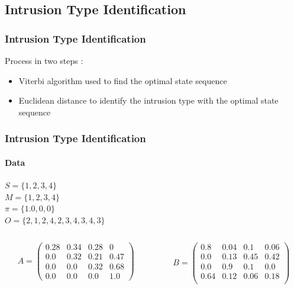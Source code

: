 \documentclass{beamer}
\begin{document}
\subsection{Intrusion Type Identification}
\begin{frame}
  \frametitle{Intrusion Type Identification}
  Process in two steps :
  \begin{itemize}
  \item Viterbi algorithm used to find the optimal state sequence
  \item Euclidean distance to identify the intrusion type with the
    optimal state sequence
  \end{itemize}
\end{frame}
\begin{frame}
  \frametitle{Intrusion Type Identification}
  \framesubtitle{Data}
  $S = \{1,2,3,4\}$\\
  $M = \{1,2,3,4\}$\\
  $\pi = \{1.0,0,0\}$\\
  $O = \{2,1,2,4,2,3,4,3,4,3\}$
  \begin{columns}[T]
    \begin{column}{.45\textwidth}
      $$
      A = \begin{pmatrix}
        0.28 & 0.34 & 0.28 & 0\\
        0.0 & 0.32 & 0.21 & 0.47\\
        0.0 & 0.0 & 0.32 & 0.68\\
        0.0 & 0.0 & 0.0 & 1.0
      \end{pmatrix}
      $$
    \end{column}
    \begin{column}{.45\textwidth}
      $$
      B = \begin{pmatrix}
        0.8 & 0.04 & 0.1 & 0.06\\
        0.0 & 0.13 & 0.45 & 0.42\\
        0.0 & 0.9 & 0.1 & 0.0\\
        0.64 & 0.12 & 0.06 & 0.18\\
      \end{pmatrix}
      $$
    \end{column}
  \end{columns}
\end{frame}
\end{document}
